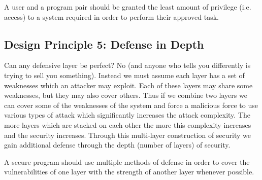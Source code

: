     \begin{keybox}
      A user and a program pair should be granted the least amount of privilege (i.e. access) to a system
        required in order to perform their approved task.
    \end{keybox}

  \subsection{Design Principle 5: Defense in Depth}
  \label{ssec:design_principle_5_defense_in_depth}

    Can any defensive layer be perfect?
    No (and anyone who tells you differently is trying to sell you something).
    Instead we must assume each layer has a set of weaknesses which an attacker may exploit.
    Each of these layers may share some weaknesses, but they may also cover others.
    Thus if we combine two layers we can cover some of the weaknesses of the system and force a malicious
      force to use various types of attack which significantly increases the attack complexity.
    The more layers which are stacked on each other the more this complexity increases and the security increases.
    Through this multi-layer construction of security we gain additional defense through the depth (number of layers)
      of security.

    \begin{keybox}
      A secure program should use multiple methods of defense in order to cover the vulnerabilities of one layer
        with the strength of another layer whenever possible.
    \end{keybox}
